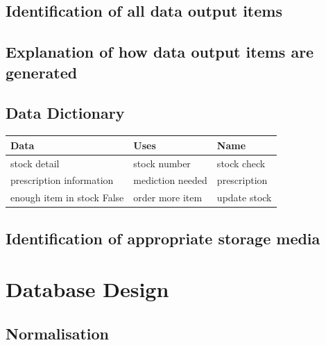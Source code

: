 \subsection{Identification of all data output items}

\subsection{Explanation of how data output items are generated}

\subsection{Data Dictionary}
\begin{table}[H]
\begin{tabular}{|l|l|l|}
\hline
Data & Uses & Name \\
\hline
stock detail & stock number & stock check\\
\hline
prescription information & mediction needed & prescription\\
\hline
enough item in stock False & order more item & update stock\\
\hline
\end{tabular}
\end{table}

\subsection{Identification of appropriate storage media}

\section{Database Design}

\subsection{Normalisation}

